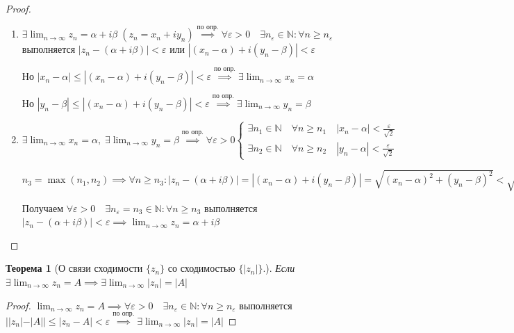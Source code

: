 \documentclass[a4paper,oneside]{article}
\newcommand{\bydef}{\stackrel{\text{по опр.}}{\implies}} %
\newcommand{\dslim}{\displaystyle\lim}
\newcommand{\dslimn}{\dslim_{n \to \infty}}
\newtheorem{theorem}{Теорема}[subsection]
\begin{document}
\begin{proof}
    \begin{enumerate}
        \item
            $\exists \dslimn z_n = \alpha + i \beta \; (z_n = x_n + i y_n)
            \bydef \forall \varepsilon > 0 \quad \exists n_\varepsilon \in \mathbb{N}:
            \forall n \ge n_\varepsilon$ выполняется $|z_n - (\alpha + i \beta)| < \varepsilon$
            или $|(x_n- \alpha) + i (y_n - \beta)| < \varepsilon$
        
            Но $|x_n - \alpha| \le |(x_n - \alpha) + i (y_n - \beta)| < \varepsilon
            \bydef \exists \dslimn x_n = \alpha$
        
            Но $|y_n - \beta| \le |(x_n - \alpha) + i (y_n - \beta)| < \varepsilon
            \bydef \exists \dslimn y_n = \beta$
    
        \item 
            $\exists \dslimn x_n = \alpha, \; \exists \dslimn y_n = \beta
            \bydef \forall \varepsilon > 0 \begin{cases}
                \exists n_1 \in \mathbb{N} \quad \forall n \ge n_1 \quad |x_n - \alpha| < \frac{\varepsilon}{\sqrt{2}} \\
                \exists n_2 \in \mathbb{N} \quad \forall n \ge n_2 \quad |y_n - \alpha| < \frac{\varepsilon}{\sqrt{2}}
            \end{cases}$
            
            $n_3 = \max (n_1, n_2) \implies \forall n \ge n_3:
            |z_n - (\alpha + i \beta)| = |(x_n - \alpha) + i (y_n - \beta)| =
            \sqrt{(x_n - \alpha)^2 + (y_n - \beta)^2} <
            \sqrt{\frac{\varepsilon^2}{2} + \frac{\varepsilon^2}{2}} = \varepsilon$
        
            Получаем $\forall \varepsilon > 0 \quad \exists n_\varepsilon = n_3 \in \mathbb{N}:
            \forall n \ge n_3$ выполняется $|z_n - (\alpha + i \beta)| < \varepsilon
            \implies \dslimn z_n = \alpha + i \beta$
    \end{enumerate}
\end{proof}

\begin{theorem}[О связи сходимости $\{z_n\}$ со сходимостью $\{|z_n|\}$.]
    Если $\exists \dslimn z_n = A \implies \exists \dslimn |z_n| = |A|$
\end{theorem}

\begin{proof}
    $\dslimn z_n = A \implies \forall \varepsilon > 0 \quad \exists n_\varepsilon \in \mathbb{N}:
    \forall n \ge n_\varepsilon$ выполняется $||z_n| - |A|| \le |z_n - A| < \varepsilon
    \bydef \exists \dslimn |z_n| = |A|$
\end{proof}
\end{document}

